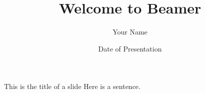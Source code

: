 \documentclass{beamer}
\title{Welcome to Beamer} %
\author{Your Name}
\institute{Where You're From} %
\date{Date of Presentation} %
\begin{document}
\begin{frame}
\titlepage %
\end{frame}

\begin{frame}{This is the title of a slide}
Here is a sentence.
\end{frame}
\end{document}
